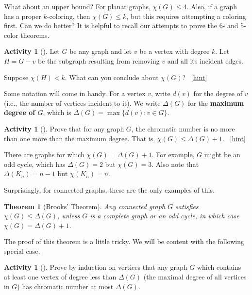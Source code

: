 \documentclass[10pt,]{book}
\newcommand{\terminology}[1]{\textbf{#1}}
\theoremstyle{plain}
\newtheorem{theorem}{Theorem}[section]
\theoremstyle{definition}
\theoremstyle{definition}
\theoremstyle{definition}
\newtheorem{activity}[project]{Activity}
\numberwithin{equation}{chapter}
\def\st{:}
\newcommand{\lt}{<}
\begin{document}
\hypertarget{p-1645}{}%
What about an upper bound?  For planar graphs, \(\chi(G) \le 4\).  Also, if a graph has a proper \(k\)-coloring, then \(\chi(G) \le k\), but this requires attempting a coloring first.  Can we do better? It is helpful to recall our attempts to prove the 6- and 5-color theorems.%
\begin{activity}[]\label{activity-302}
\hypertarget{p-1646}{}%
Let \(G\) be any graph and let \(v\) be a vertex with degree \(k\).  Let \(H = G - v\) be the subgraph resulting from removing \(v\) and all its incident edges.%
\par
\hypertarget{p-1647}{}%
Suppose \(\chi(H) \lt k\).  What can you conclude about \(\chi(G)\)?%
~\hfill{\tiny\hyperlink{a-309}{[hint]}\hypertarget{q-309}{}}\end{activity}
\hypertarget{p-1649}{}%
Some notation will come in handy.  For a vertex \(v\), write \(d(v)\) for the degree of \(v\) (i.e., the number of vertices incident to it).  We write \(\Delta(G)\) for the \terminology{maximum degree of \(G\)}, which is \(\Delta(G) = \max\{d(v) \st v \in G\}\).%
\begin{activity}[]\label{activity-303}
\hypertarget{p-1650}{}%
Prove that for any graph \(G\), the chromatic number is no more than one more than the maximum degree.  That is, \(\chi(G) \le \Delta(G) + 1\).%
~\hfill{\tiny\hyperlink{a-310}{[hint]}\hypertarget{q-310}{}}\end{activity}
\hypertarget{p-1652}{}%
There are graphs for which \(\chi(G) = \Delta(G) + 1\).  For example, \(G\) might be an odd cycle, which has \(\Delta(G) = 2\) but \(\chi(G) = 3\).  Also note that \(\Delta(K_n) = n-1\) but \(\chi(K_n) = n\).%
\par
\hypertarget{p-1653}{}%
Surprisingly, for connected graphs, these are the only examples of this.%
\begin{theorem}[{Brooks' Theorem}]\label{theorem-15}
\hypertarget{p-1654}{}%
 Any connected graph \(G\) satisfies \(\chi(G) \le \Delta(G)\), unless \(G\) is a complete graph or an odd cycle, in which case \(\chi(G) = \Delta(G) + 1\).%
\end{theorem}
\hypertarget{p-1655}{}%
The proof of this theorem is a little tricky.  We will be content with the following special case.%
\begin{activity}[]\label{activity-304}
\hypertarget{p-1656}{}%
Prove by induction on vertices that any graph \(G\) which contains at least one vertex of degree less than \(\Delta(G)\) (the maximal degree of all vertices in \(G\)) has chromatic number at most \(\Delta(G)\).%
\end{activity}
\typeout{************************************************}
\typeout{************************************************}
\end{document}
